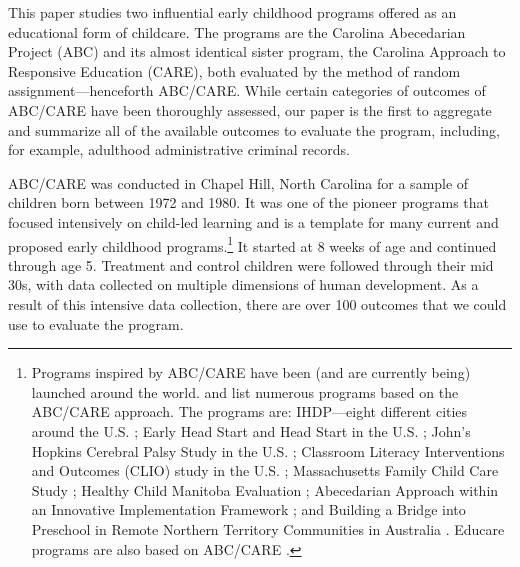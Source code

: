 This paper studies two influential early childhood programs offered as an educational form of childcare. The programs are the Carolina Abecedarian Project (ABC) and its almost identical sister program, the Carolina Approach to Responsive Education (CARE), both evaluated by the method of random assignment---henceforth ABC/CARE. While certain categories of outcomes of ABC/CARE have been thoroughly assessed, our paper is the first to aggregate and summarize all of the available outcomes to evaluate the program, including, for example, adulthood administrative criminal records.

ABC/CARE was conducted in Chapel Hill, North Carolina for a sample of children born between 1972 and 1980. It was one of the pioneer programs that focused intensively on child-led learning and is a template for many current and proposed early childhood programs.\footnote{Programs inspired by ABC/CARE have been (and are currently being) launched around the world. \citet{Sparling_2010_Highlights} and \citet{Ramey_Ramey_Lanzi_2014_Interventions} list numerous programs based on the ABC/CARE approach. The programs are: IHDP---eight different cities around the U.S. \citep{Spiker-etal_1997_Helping}; Early Head Start and Head Start in the U.S. \citep{Schneider_McDonald-eds_2007_Scale-Up_Vol-1}; John's Hopkins Cerebral Palsy Study in the U.S. \citep{Sparling_2010_Highlights}; Classroom Literacy Interventions and Outcomes (CLIO) study in the U.S. \citep{Sparling_2010_Highlights}; Massachusetts Family Child Care Study \citep{Collins_etal_2010_Massachusetts-Study}; Healthy Child Manitoba Evaluation \citep{Healthy_Child_Manitoba_2015_Starting-Early}; Abecedarian Approach within an Innovative Implementation Framework \citep{Jensen_Nielsen_2016_ABC-Programme-Pilot}; and Building a Bridge into Preschool in Remote Northern Territory Communities in Australia \citep{UMonash_Dataset_2015_URL}. Educare programs are also based on ABC/CARE \citep{Educare_2014_Research_Agenda,Yazejian_Bryant_2012_Educare}.} It started at 8 weeks of age and continued through age 5. Treatment and control children were followed through their mid 30s, with data collected on multiple dimensions of human development. As a result of this intensive data collection, there are over 100 outcomes that we could use to evaluate the program.

